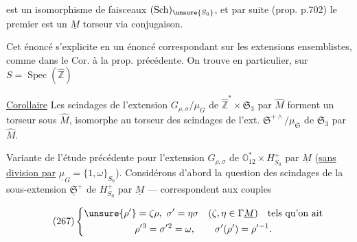 
est un isomorphisme de faisceaux 
$(\mathrm{Sch})_{\unsure{S_0}}$, et par suite (prop. p.702)
le premier est un $\underline{M}$ torseur via conjugaison.

Cet énoncé s'explicite en un énoncé correspondant sur les extensions
ensemblistes, comme dans le Cor. à la prop. précédente.
On trouve en particulier, sur $S=\operatorname{Spec}(\widehat{\mathbb{Z}})$

\uline{Corollaire} Les scindages de l'extension
$G_{\rho,\sigma}/\mu_G$ de
$\widehat{\mathbb{Z}}^{*}\times\mathfrak{S}_3$ par $\widehat{M}$
forment un torseur sous $\widehat{M}$, isomorphe
 au torseur des scindages de l'ext.
$\mathfrak{S}^{+\wedge}/\mu_{\mathfrak{S}}$  de
$\mathfrak{S}_3$ par $\widehat{M}$.


Variante de l'étude précédente pour l'extension $G_{\rho,\sigma}$ de
$\mathbb O_{12}^{*}\times H_{S_0}^{+}$ par
$\underline{M}$ (\uline{sans division par}
$\underline{\mu}_G=\{1,\omega\}_{S_0}$). Considérons d'abord la question des
scindages de la sous-extension $\underline{\mathfrak{S}}^{+}$ de
$H_{S_0}^{+}$ par $\underline{M}$ --- 
correspondent aux couples


\[
\tag{267}
\left\{
\begin{gathered}
\unsure{\rho'}=\zeta\rho,\ \sigma'=\eta\sigma
\quad(\zeta,\eta\in\Gamma\underline M)\quad\text{tels qu'on ait}
\\
\rho'{}^3=\sigma'{}^2=\omega,\qquad
\sigma'(\rho')=\rho'{}^{-1}.
\end{gathered}\right.
\]

